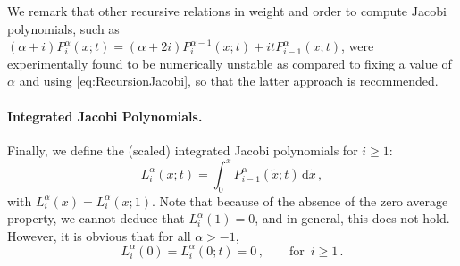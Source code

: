 We remark that other recursive relations in weight and order to compute Jacobi polynomials, such as $(\alpha+i)P_i^\alpha(x;t)=(\alpha+2i)P_i^{\alpha-1}(x;t)+itP_{i-1}^\alpha(x;t)$, were experimentally found to be numerically unstable as compared to fixing a value of $\alpha$ and using \eqref{eq:RecursionJacobi}, so that the latter approach is recommended.




\paragraph{Integrated Jacobi Polynomials.}
Finally, we define the (scaled) integrated Jacobi polynomials for $i\geq1$:
\begin{equation}
	L^{\alpha}_i(x;t) = \int_0^x P^{\alpha}_{i-1} (\tilde{x};t) \, \mathrm{d}\tilde{x} \, ,
\end{equation}
with $L^{\alpha}_i(x)=L^{\alpha}_i(x;1)$. Note that because of the absence of the zero average property, we cannot deduce that $L^\alpha_i(1)=0$, and in general, this does not hold. However, it is obvious that for all $\alpha>-1$,
\begin{equation}
	L^\alpha_i(0)=L^\alpha_i(0;t)=0\,,\quad\quad\text{for }\,i\geq1\,.\label{eq:Lalphavanishzero}
\end{equation}

